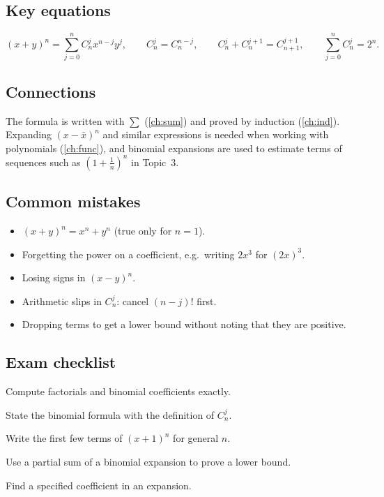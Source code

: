 \subsection*{Key equations}
\[
(x+y)^n=\sum_{j=0}^{n}C_n^jx^{n-j}y^j,\qquad C_n^j=C_n^{n-j},\qquad C_n^j+C_n^{j+1}=C_{n+1}^{j+1},\qquad \sum_{j=0}^nC_n^j=2^n.
\]

\subsection*{Connections}
The formula is written with $\sum$ (\cref{ch:sum}) and proved by induction (\cref{ch:ind}). Expanding $(x-\bar x)^n$ and
similar expressions is needed when working with polynomials (\cref{ch:func}), and binomial expansions are used to
estimate terms of sequences such as $(1+\frac1n)^n$ in Topic~3.

\subsection*{Common mistakes}
\begin{itemize}
  \item $(x+y)^n=x^n+y^n$ (true only for $n=1$).
  \item Forgetting the power on a coefficient, e.g.\ writing $2x^3$ for $(2x)^3$.
  \item Losing signs in $(x-y)^n$.
  \item Arithmetic slips in $C_n^j$: cancel $(n-j)!$ first.
  \item Dropping terms to get a lower bound without noting that they are positive.
\end{itemize}

\subsection*{Exam checklist}
\begin{checklist}
  \item Compute factorials and binomial coefficients exactly.
  \item State the binomial formula with the definition of $C_n^j$.
  \item Write the first few terms of $(x+1)^n$ for general $n$.
  \item Use a partial sum of a binomial expansion to prove a lower bound.
  \item Find a specified coefficient in an expansion.
\end{checklist}


